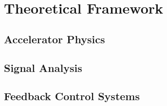 \chapter{Theoretical Framework}
\section{Accelerator Physics}
\section{Signal Analysis}
\section{Feedback Control Systems}